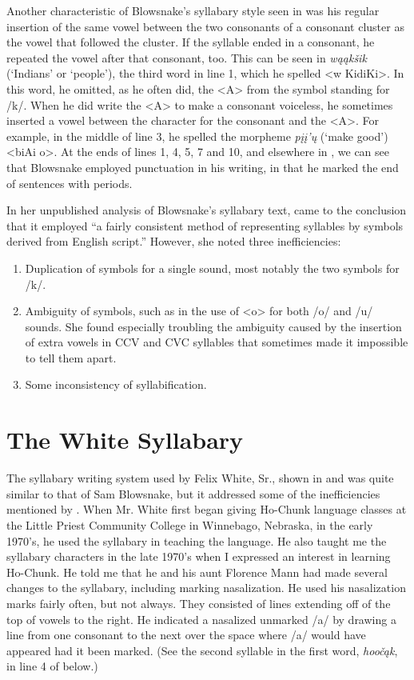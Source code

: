 \documentclass[output=paper]{LSP/langsci}
\begin{document}
Another characteristic of Blowsnake's syllabary style seen in  was his regular insertion of the same vowel between the two consonants of a consonant cluster as the vowel that followed the cluster. If the syllable ended in a consonant, he repeated the vowel after that consonant, too. This can be seen in \emph{w\k{a}\k{a}k\v{s}ik} (`Indians' or `people'), the third word in line 1, which he spelled <w KidiKi>. In this word, he omitted, as he often did, the <A> from the symbol standing for /k/. When he did write the <A> to make a consonant voiceless, he sometimes inserted a vowel between the character for the consonant and the <A>. For example, in the middle of line 3, he spelled the morpheme \emph{p\k{i}\k{i}'\k{u}} (`make good') <biAi o>. At the ends of lines 1, 4, 5, 7 and 10, and elsewhere in , we can see that Blowsnake employed punctuation in his writing, in that he marked the end of sentences with periods.

In her unpublished analysis of Blowsnake's syllabary text, \citeauthor{Susman1939} came to the conclusion that it employed ``a fairly consistent method of representing syllables by symbols derived from English script.'' However, she noted three inefficiencies: 


\begin{enumerate}
\item{Duplication of symbols for a single sound, most notably the two symbols for /k/.}
\item{Ambiguity of symbols, such as in the use of <o> for both /o/ and /u/ sounds. She found especially troubling the ambiguity caused by the insertion of extra vowels in CCV and CVC syllables that sometimes made it impossible to tell them apart.}
\item{Some inconsistency of syllabification.}
\end{enumerate}

\section{The White Syllabary}

The syllabary writing system used by Felix White, Sr., shown in  and  was quite similar to that of Sam Blowsnake, but it addressed some of the inefficiencies mentioned by \citeauthor{Susman1939}. When Mr. White first began giving Ho-Chunk language classes at the Little Priest Community College in Winnebago, Nebraska, in the early 1970's, he used the syllabary in teaching the language. He also taught me the syllabary characters in the late 1970's when I expressed an interest in learning Ho-Chunk. He told me that he and his aunt Florence Mann had made several changes to the syllabary, including marking nasalization. He used his nasalization marks fairly often, but not always. They consisted of lines extending off of the top of vowels to the right. He indicated a nasalized unmarked /a/ by drawing a line from one consonant to the next over the space where /a/ would have appeared had it been marked. (See the second syllable in the first word, \emph{hoo\v{c}\k{a}k}, in line 4 of  below.)
\end{document}
